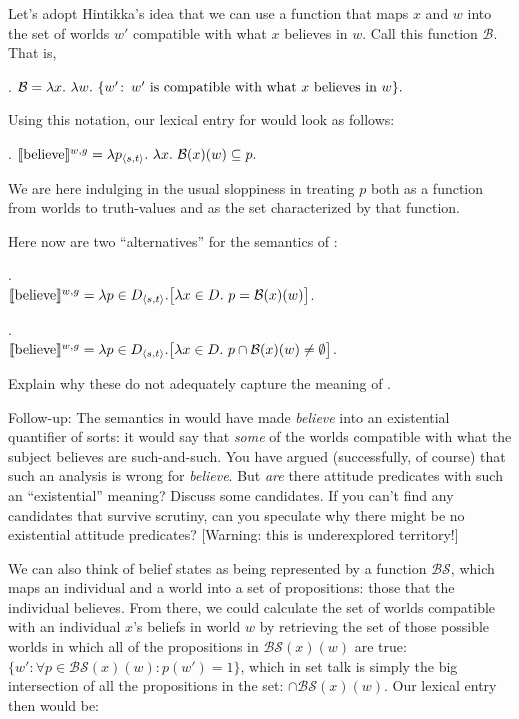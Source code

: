 \begin{exercise}
	
	Let's adopt Hintikka's idea that we can use a function that maps $x$ and $w$
  into the set of worlds $w'$ compatible with what $x$ believes in $w$. Call
  this function $\mathcal{B}$. That is,
	
	\ex. $\mathcal{B} = \lambda x.\ \lambda w.\ \{w'\co w' \mbox{ is compatible with what } x \mbox{ believes in } w\}.$
	
	Using this notation, our lexical entry for  would look as
  follows:
	
	\ex. $\llbracket \mbox{believe} \rrbracket^{w,g} = \lambda p_{\langle s,t \rangle}.\ \lambda x.\ \mathcal{B}(x)(w) \subseteq p.$
	
	We are here indulging in the usual sloppiness in treating $p$ both as a
  function from worlds to truth-values and as the set characterized by that
  function.
	
	Here now are two ``alternatives'' for the semantics of :
	
	\ex. \\[3pt]
	$\llbracket \mbox{believe} \rrbracket^{w,g} = \lambda p \in D_{\langle s,t \rangle}. \big[ \lambda x \in D.\ p = \mathcal{B}(x)(w) \big]$.
	
	\ex. \\[3pt]
	$\llbracket \mbox{believe} \rrbracket^{w,g} = \lambda p \in D_{\langle s,t \rangle}. \big[ \lambda x \in D.\ p \cap \mathcal{B}(x)(w) \neq \emptyset \big]$.
	
	Explain why these do not adequately capture the meaning of
  . \eex
\end{exercise}
%
\begin{exercise}
  Follow-up: The semantics in \Last would have made \emph{believe} into an
  existential quantifier of sorts: it would say that \emph{some} of the worlds
  compatible with what the subject believes are such-and-such. You have argued
  (successfully, of course) that such an analysis is wrong for \emph{believe}.
  But \emph{are} there attitude predicates with such an ``existential'' meaning?
  Discuss some candidates. If you can't find any candidates that survive
  scrutiny, can you speculate why there might be no existential attitude
  predicates? [Warning: this is underexplored territory!]\eex
\end{exercise}
%
\clearpage We can also think of belief states as being represented by a function
$\mathcal{BS}$, which maps an individual and a world into a set of
propositions: those that the individual believes. From there, we could calculate
the set of worlds compatible with an individual $x$'s beliefs in world $w$ by
retrieving the set of those possible worlds in which all of the propositions in
$\mathcal{BS}(x)(w)$ are true: $\{w': \forall p \in \mathcal{BS}(x)(w): p(w') =
1\}$, which in set talk is simply the big intersection of all the propositions
in the set: $\cap \mathcal{BS}(x)(w)$. Our lexical entry then would be:

